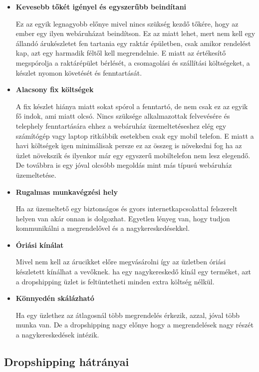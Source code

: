 \begin{itemize}
    \item \textbf{Kevesebb tőkét igényel és egyszerűbb beindítani}
    
Ez az egyik legnagyobb előnye mivel nincs szükség kezdő tőkére, hogy az ember egy ilyen webáruházat beindítson. Ez az miatt lehet, mert nem kell egy állandó árukészletet fen tartania egy raktár épületben, csak amikor rendelést kap, azt egy harmadik féltől kell megrendelnie. E miatt az értékesítő megspórolja a raktárépület bérlését, a csomagolási és szállítási költségeket, a készlet nyomon követését és fenntartását.

    \item \textbf{Alacsony fix költségek}
    
A fix készlet hiánya miatt sokat spórol a fenntartó, de nem csak ez az egyik fő indok, ami miatt olcsó. Nincs szüksége alkalmazottak felvevésére és telephely fenntartására ehhez a webáruház üzemeltetéseshez elég egy számítógép vagy laptop ritkábbik esetekben csak egy mobil telefon. E miatt a havi költségek igen minimálisak persze ez az összeg is növekedni fog ha az üzlet növekszik és ilyenkor már egy egyszerű mobiltelefon nem lesz elegendő. De továbbra is egy jóval olcsóbb megoldás mint más típusú webáruház üzemeltetése.

    \item \textbf{Rugalmas munkavégzési hely}
    
Ha az üzemeltető egy biztonságos és gyors internetkapcsolattal felszerelt helyen van akár onnan is dolgozhat. Egyetlen lényeg van, hogy tudjon kommunikálni a megrendelővel és a nagykereskedésekkel.

    \item \textbf{Óriási kínálat}
    
Mivel nem kell az árucikket előre megvásárolni így az üzletben óriási készletett kínálhat a vevőknek. ha egy nagykereskedő kínál egy terméket, azt a dropshipping üzlet is feltüntetheti minden extra költség nélkül.

    \item \textbf{Könnyedén skálázható}
    
Ha egy üzlethez az átlagosnál több megrendelés érkezik, azzal, jóval több munka van. De a dropshipping nagy előnye hogy a megrendelések nagy részét a nagykereskedések intézik.

\end{itemize}

\subsection{Dropshipping hátrányai}

